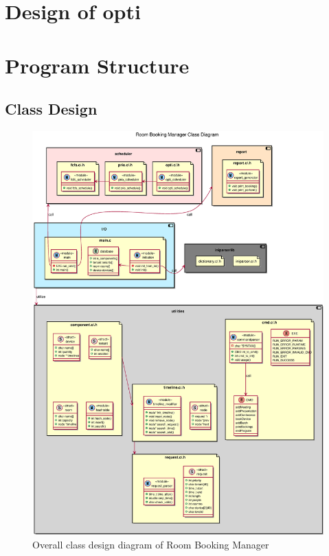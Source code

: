 \documentclass{article}
\begin{document}
    \section{Design of opti}

    \cleardoublepage
    \section{Program Structure}
        \subsection{Class Design}
            \begin{figure}[!htbp]
                \centering
                \includegraphics[scale=0.4]{./img/class_diagram.eps}
                \caption{Overall class design diagram of Room Booking Manager}
            \end{figure}
\end{document}

